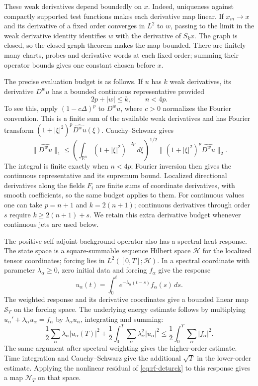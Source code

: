 These weak derivatives depend boundedly on $x$.  Indeed, uniqueness
against compactly supported test functions makes each derivative map
linear.  If $x_m\to x$ and its derivative of a fixed order converges
in $L^2$ to $w$, passing to the limit in the weak derivative identity
identifies $w$ with the derivative of $S_kx$.  The graph is closed,
so the closed graph theorem makes the map bounded.  There are finitely
many charts, probes and derivative words at each fixed order; summing
their operator bounds gives one constant chosen before $x$.

The precise evaluation budget is as follows.  If $u$ has $k$ weak
derivatives, its derivative $D^wu$ has a bounded continuous representative
provided
\begin{equation}\label{eq:rf-evaluation-budget}
 2p+|w|\leq k,\qquad n<4p.
\end{equation}
To see this, apply $(1-c\Delta)^p$ to $D^wu$, where $c>0$ normalizes
the Fourier convention.  This is a finite sum of the available weak
derivatives and has Fourier transform
$(1+|\xi|^2)^p\widehat{D^wu}(\xi)$.  Cauchy--Schwarz gives
\[
 \|\widehat{D^wu}\|_1
 \leq\left(\int_{\mathbb R^n}(1+|\xi|^2)^{-2p}\,d\xi\right)^{1/2}
       \|(1+|\xi|^2)^p\widehat{D^wu}\|_2.
\]
The integral is finite exactly when $n<4p$; Fourier inversion then
gives the continuous representative and its supremum bound.
Localized directional derivatives along the fields $F_i$ are finite
sums of coordinate derivatives, with smooth coefficients, so the same
budget applies to them.  For continuous values one can take $p=n+1$
and $k=2(n+1)$; continuous derivatives through order $s$ require
$k\geq2(n+1)+s$.  We retain this extra derivative budget whenever
continuous jets are used below.

The positive self-adjoint background operator also has a spectral heat
response.  The
state space is a square-summable sequence Hilbert space $\mathcal H$
for the localized tensor coordinates; forcing lies in
$L^2([0,T];\mathcal H)$.  In a
spectral coordinate with parameter $\lambda_\alpha\geq0$, zero initial
data and forcing $f_\alpha$ give the response
\[
 u_\alpha(t)=\int_0^t e^{-\lambda_\alpha(t-s)}f_\alpha(s)\,ds .
\]
The weighted response and its derivative coordinates give a bounded
linear map $\mathcal S_T$ on the forcing space.  The underlying energy
estimate follows by multiplying
$u_\alpha'+\lambda_\alpha u_\alpha=f_\alpha$ by
$\lambda_\alpha u_\alpha$, integrating and summing:
\[
 \frac12\sum_\alpha\lambda_\alpha |u_\alpha(T)|^2
 +\frac12\int_0^T\sum_\alpha\lambda_\alpha^2|u_\alpha|^2
 \leq\frac12\int_0^T\sum_\alpha|f_\alpha|^2.
\]
The same argument after spectral weighting gives the higher-order
estimate.  Time integration and Cauchy--Schwarz give the additional
$\sqrt T$ in the lower-order estimate.  Applying the nonlinear
residual of \eqref{eq:rf-deturck} to this response gives a map
$\mathcal N_T$ on that space.

